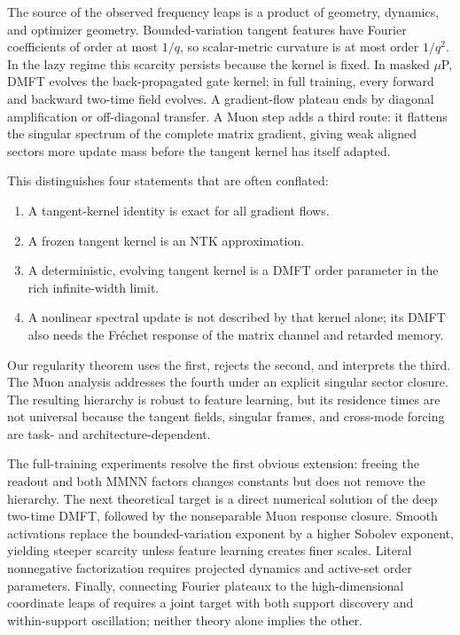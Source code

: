 \documentclass[11pt]{article}
\newcommand{\1}{\mathbf 1}
\theoremstyle{plain}
\theoremstyle{definition}
\begin{document}
The source of the observed frequency leaps is a product of geometry,
dynamics, and optimizer geometry.  Bounded-variation tangent features have
Fourier coefficients of order at most \(1/q\), so scalar-metric curvature is
at most order \(1/q^2\).  In the lazy regime this scarcity persists because
the kernel is fixed.  In masked \(\mu\)P, DMFT evolves the back-propagated
gate kernel; in full training, every forward and backward two-time field
evolves.  A gradient-flow plateau ends by diagonal amplification or
off-diagonal transfer.  A Muon step adds a third route: it flattens the
singular spectrum of the complete matrix gradient, giving weak aligned
sectors more update mass before the tangent kernel has itself adapted.

This distinguishes four statements that are often conflated:

\begin{enumerate}[leftmargin=2em]
\item A tangent-kernel identity is exact for all gradient flows.
\item A frozen tangent kernel is an NTK approximation.
\item A deterministic, evolving tangent kernel is a DMFT order parameter in
the rich infinite-width limit.
\item A nonlinear spectral update is not described by that kernel alone; its
DMFT also needs the Fr\'echet response of the matrix channel and retarded
memory.
\end{enumerate}

Our regularity theorem uses the first, rejects the second, and interprets the
third.  The Muon analysis addresses the fourth under an explicit singular
sector closure.  The resulting hierarchy is robust to feature learning, but
its residence times are not universal because the tangent fields, singular
frames, and cross-mode forcing are task- and architecture-dependent.

The full-training experiments resolve the first obvious extension: freeing
the readout and both MMNN factors changes constants but does not remove the
hierarchy.  The next theoretical target is a direct numerical solution of
the deep two-time DMFT, followed by the nonseparable Muon response closure.
Smooth activations replace the bounded-variation exponent by a higher
Sobolev exponent, yielding steeper scarcity unless feature learning creates
finer scales.  Literal nonnegative factorization requires projected dynamics
and active-set order parameters.  Finally, connecting Fourier plateaux to
the high-dimensional coordinate leaps of \citet{abbe2023leap} requires a
joint target with both support discovery and within-support oscillation;
neither theory alone implies the other.
\end{document}
